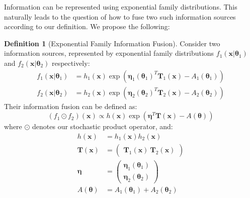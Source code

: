 \documentclass[letterpaper]{article} %
\theoremstyle{definition}
\newtheorem{definition}[theorem]{Definition}
\theoremstyle{remark}
\begin{document}
Information can be represented using exponential family distributions. This naturally leads to the question of how to fuse two such information sources according to our definition. We propose the following:
\begin{definition}[Exponential Family Information Fusion]
Consider two information sources, represented by exponential family distributions $f_1(\mathbf{x}|\boldsymbol{\theta}_1)$ and $f_2(\mathbf{x}|\boldsymbol{\theta}_2)$ respectively:
\begin{align*}
f_1(\mathbf{x}|\boldsymbol{\theta}_1) &= h_1(\mathbf{x})\exp\left(\boldsymbol{\eta}_1(\boldsymbol{\theta}_1)^T \mathbf{T}_1(\mathbf{x}) - A_1(\boldsymbol{\theta}_1)\right) \\
f_2(\mathbf{x}|\boldsymbol{\theta}_2) &= h_2(\mathbf{x})\exp\left(\boldsymbol{\eta}_2(\boldsymbol{\theta}_2)^T \mathbf{T}_2(\mathbf{x}) - A_2(\boldsymbol{\theta}_2)\right)
\end{align*}
Their information fusion can be defined as:
\begin{equation}
(f_1 \odot f_2)(\mathbf{x}) \propto h(\mathbf{x})\exp\left(\boldsymbol{\eta}^T \mathbf{T}(\mathbf{x}) - A(\boldsymbol{\theta})\right)
\end{equation}
where $\odot$ denotes our stochastic product operator, and:
\begin{align*}
h(\mathbf{x}) &= h_1(\mathbf{x})h_2(\mathbf{x}) \\
\mathbf{T}(\mathbf{x}) &= \begin{pmatrix} \mathbf{T}_1(\mathbf{x}) \ \mathbf{T}_2(\mathbf{x}) \end{pmatrix} \\
\boldsymbol{\eta} &= \begin{pmatrix} \boldsymbol{\eta}_1(\boldsymbol{\theta}_1) \\ \boldsymbol{\eta}_2(\boldsymbol{\theta}_2) \end{pmatrix} \\
A(\boldsymbol{\theta}) &= A_1(\boldsymbol{\theta}_1) + A_2(\boldsymbol{\theta}_2)
\end{align*}
\end{definition}
\end{document}
